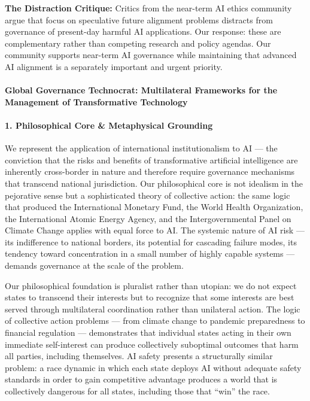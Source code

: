 \textbf{The Distraction Critique:} Critics from the near-term AI ethics
community argue that focus on speculative future alignment problems
distracts from governance of present-day harmful AI applications. Our
response: these are complementary rather than competing research and
policy agendas. Our community supports near-term AI governance while
maintaining that advanced AI alignment is a separately important and
urgent priority.

\paragraph{Global Governance Technocrat: Multilateral Frameworks for the
Management of Transformative
Technology}\label{global-governance-technocrat-multilateral-frameworks-for-the-management-of-transformative-technology}

\paragraph{1. Philosophical Core \& Metaphysical
Grounding}\label{philosophical-core-metaphysical-grounding-4}

We represent the application of international institutionalism to AI ---
the conviction that the risks and benefits of transformative artificial
intelligence are inherently cross-border in nature and therefore require
governance mechanisms that transcend national jurisdiction. Our
philosophical core is not idealism in the pejorative sense but a
sophisticated theory of collective action: the same logic that produced
the International Monetary Fund, the World Health Organization, the
International Atomic Energy Agency, and the Intergovernmental Panel on
Climate Change applies with equal force to AI. The systemic nature of AI
risk --- its indifference to national borders, its potential for
cascading failure modes, its tendency toward concentration in a small
number of highly capable systems --- demands governance at the scale of
the problem.

Our philosophical foundation is pluralist rather than utopian: we do not
expect states to transcend their interests but to recognize that some
interests are best served through multilateral coordination rather than
unilateral action. The logic of collective action problems --- from
climate change to pandemic preparedness to financial regulation ---
demonstrates that individual states acting in their own immediate
self-interest can produce collectively suboptimal outcomes that harm all
parties, including themselves. AI safety presents a structurally similar
problem: a race dynamic in which each state deploys AI without adequate
safety standards in order to gain competitive advantage produces a world
that is collectively dangerous for all states, including those that
``win'' the race.

